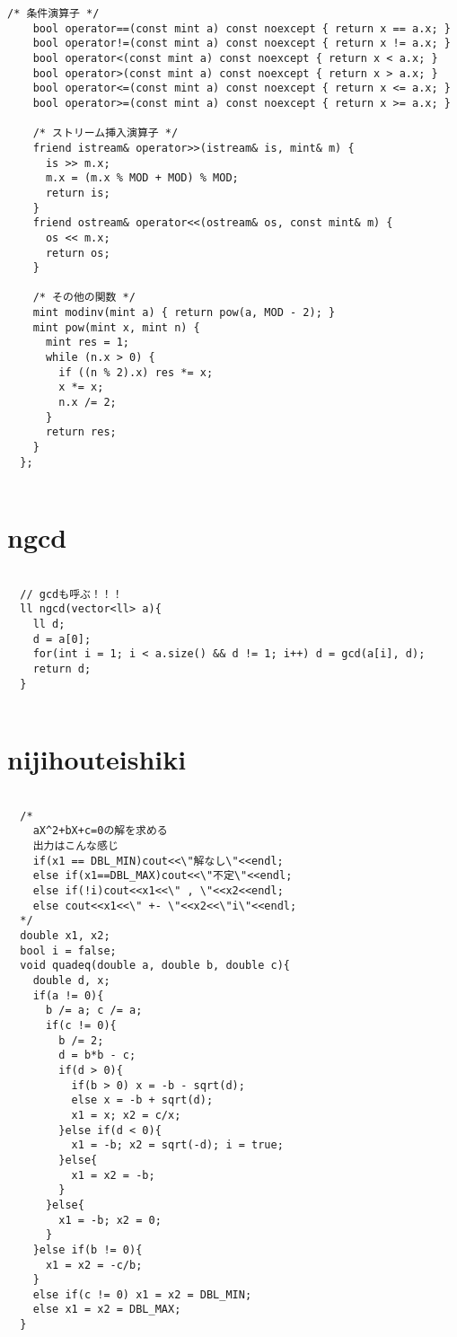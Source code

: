 \documentclass{jsarticle}
\begin{document}
\begin{lstlisting}[caption=modint]
    /* 条件演算子 */
    bool operator==(const mint a) const noexcept { return x == a.x; }
    bool operator!=(const mint a) const noexcept { return x != a.x; }
    bool operator<(const mint a) const noexcept { return x < a.x; }
    bool operator>(const mint a) const noexcept { return x > a.x; }
    bool operator<=(const mint a) const noexcept { return x <= a.x; }
    bool operator>=(const mint a) const noexcept { return x >= a.x; }
  
    /* ストリーム挿入演算子 */
    friend istream& operator>>(istream& is, mint& m) {
      is >> m.x;
      m.x = (m.x % MOD + MOD) % MOD;
      return is;
    }
    friend ostream& operator<<(ostream& os, const mint& m) {
      os << m.x;
      return os;
    }
  
    /* その他の関数 */
    mint modinv(mint a) { return pow(a, MOD - 2); }
    mint pow(mint x, mint n) {
      mint res = 1;
      while (n.x > 0) {
        if ((n % 2).x) res *= x;
        x *= x;
        n.x /= 2;
      }
      return res;
    }
  };
  

\end{lstlisting}

\color{white}
\section{ngcd}
\color{black}
\begin{lstlisting}[caption=ngcd]

  // gcdも呼ぶ！！！
  ll ngcd(vector<ll> a){
    ll d;
    d = a[0];
    for(int i = 1; i < a.size() && d != 1; i++) d = gcd(a[i], d);
    return d;
  }
  

\end{lstlisting}

\color{white}
\section{nijihouteishiki}
\color{black}
\begin{lstlisting}[caption=nijihouteishiki]

  /*
    aX^2+bX+c=0の解を求める
    出力はこんな感じ
    if(x1 == DBL_MIN)cout<<\"解なし\"<<endl;
    else if(x1==DBL_MAX)cout<<\"不定\"<<endl;
    else if(!i)cout<<x1<<\" , \"<<x2<<endl;
    else cout<<x1<<\" +- \"<<x2<<\"i\"<<endl;
  */
  double x1, x2;
  bool i = false;
  void quadeq(double a, double b, double c){
    double d, x;
    if(a != 0){
      b /= a; c /= a;
      if(c != 0){
        b /= 2;
        d = b*b - c;
        if(d > 0){
          if(b > 0) x = -b - sqrt(d);
          else x = -b + sqrt(d);
          x1 = x; x2 = c/x;
        }else if(d < 0){
          x1 = -b; x2 = sqrt(-d); i = true;
        }else{
          x1 = x2 = -b;
        }
      }else{
        x1 = -b; x2 = 0;
      }
    }else if(b != 0){
      x1 = x2 = -c/b;
    }
    else if(c != 0) x1 = x2 = DBL_MIN;
    else x1 = x2 = DBL_MAX;
  }
  

\end{lstlisting}
\end{document}
